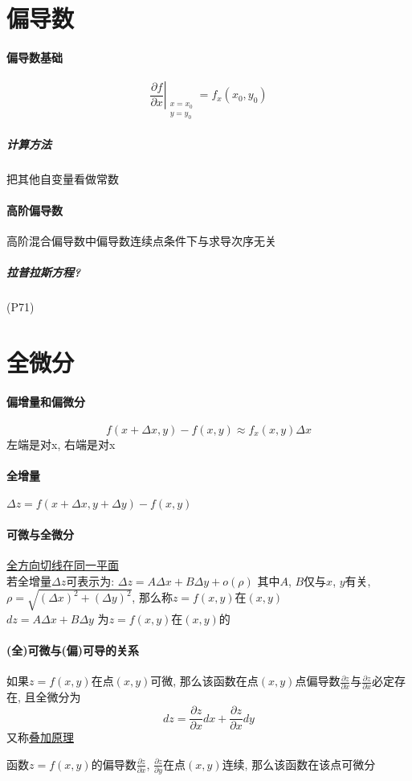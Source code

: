 \documentclass[main.tex]{subfiles}
\begin{document}
\section{偏导数}
\paragraph{偏导数基础}
\[ \left. \frac{\partial f}{\partial x} \right|_{\begin{smallmatrix}x = x_0\\y = y_0\end{smallmatrix}} = f_x(x_0, y_0) \]
\subparagraph{计算方法} 把其他自变量看做常数
\paragraph{高阶偏导数}
    高阶混合偏导数中偏导数连续点条件下与求导次序无关
\subparagraph{拉普拉斯方程?} (P71)

\section{全微分}
\paragraph{偏增量和偏微分}
\[ f(x + \Delta x, y) - f(x, y) \approx f_x(x, y) \Delta x \]
左端是对x, 右端是对x
\paragraph{全增量}
$\Delta z = f (x + \Delta x, y + \Delta y) - f(x, y)$
\paragraph{可微与全微分}
\underline{全方向切线在同一平面}\\
若全增量$\Delta z$可表示为: $\Delta z = A \Delta x + B \Delta y + o(\rho)$
其中$A$, $B$仅与$x$, $y$有关, $\rho = \sqrt{(\Delta x)^2 + (\Delta y)^2}$,
那么称$z = f(x, y)$在$(x, y)$\\
$dz = A \Delta x + B \Delta y$ 为$z = f(x, y)$在$(x, y)$的
\paragraph{(全)可微与(偏)可导的关系}
\begin{mthm*}[可微一定可导]
如果$z = f(x, y)$在点$(x, y)$可微, 那么该函数在点$(x, y)$点偏导数$\frac{\partial z}{\partial x}$与$\frac{\partial z}{\partial x}$必定存在,
且全微分为
\begin{equation}
    dz = \frac{\partial z}{\partial x} dx + \frac{\partial z}{\partial x} dy \tag{全微分}
\end{equation}
又称\underline{叠加原理}
\end{mthm*}
\begin{mthm*}[可导不一定可微]
    函数$z = f(x, y)$的偏导数$\frac{\partial z}{\partial x}$, $\frac{\partial z}{\partial y}$在点$(x, y)$连续, 那么该函数在该点可微分
\end{mthm*}
\end{document}
